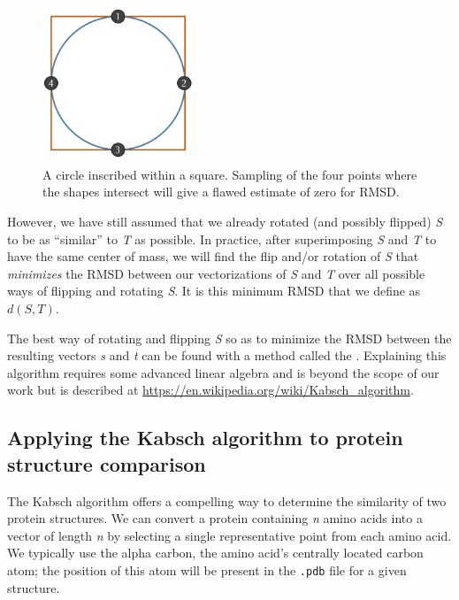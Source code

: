 \begin{figure}[h]
	\centering
	\mySfFamily
	\includegraphics[width = 0.4\textwidth]{../images/circle_square_undersampling.png}
	\caption{A circle inscribed within a square. Sampling of the four points where the shapes intersect will give a flawed estimate of zero for RMSD.}
	\label{fig:circle_square_undersampling}
\end{figure}

However, we have still assumed that we already rotated (and possibly flipped) \textit{S} to be as ``similar'' to \textit{T} as possible. In practice, after superimposing \textit{S} and \textit{T} to have the same center of mass, we will find the flip and/or rotation of \textit{S} that \textit{minimizes} the RMSD between our vectorizations of \textit{S} and \textit{T} over all possible ways of flipping and rotating \textit{S}. It is this minimum RMSD that we define as $d(S, T)$.

The best way of rotating and flipping \textit{S} so as to minimize the RMSD between the resulting vectors \textit{s} and \textit{t} can be found with a method called the . Explaining this algorithm requires some advanced linear algebra and is beyond the scope of our work but is described at \url{https://en.wikipedia.org/wiki/Kabsch_algorithm}.

\FloatBarrier
{}
\subsection{Applying the Kabsch algorithm to protein structure comparison}

The Kabsch algorithm offers a compelling way to determine the similarity of two protein structures. We can convert a protein containing \textit{n} amino acids into a vector of length \textit{n} by selecting a single representative point from each amino acid. We typically use the alpha carbon, the amino acid's centrally located carbon atom; the position of this atom will be present in the \texttt{.pdb} file for a given structure.\\

